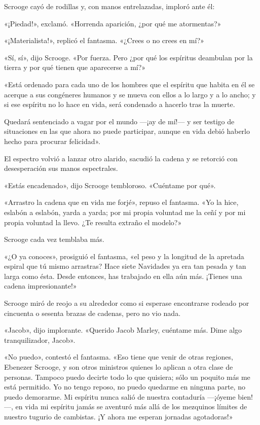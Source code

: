 \documentclass{novela}
\begin{document}
 Scrooge cayó de rodillas y, con manos entrelazadas, imploró ante él:

 «¡Piedad!», exclamó. «Horrenda aparición, ¿por qué me atormentas?»

 «¡Materialista!», replicó el fantasma. «¿Crees o no crees en mí?»

 «Sí, sí», dijo Scrooge. «Por fuerza. Pero ¿por qué los espíritus deambulan por la tierra y por qué tienen que aparecerse a mí?»

 «Está ordenado para cada uno de los hombres que el espíritu que habita en él se acerque a sus congéneres humanos y se mueva con ellos a lo largo y a lo ancho; y si ese espíritu no lo hace en vida, será condenado a hacerlo tras la muerte.

 Quedará sentenciado a vagar por el mundo ---¡ay de mí!--- y ser testigo de situaciones en las que ahora no puede participar, aunque en vida debió haberlo hecho para procurar felicidad».

 El espectro volvió a lanzar otro alarido, sacudió la cadena y se retorció con desesperación sus manos espectrales.

 «Estás encadenado», dijo Scrooge tembloroso. «Cuéntame por qué».

 «Arrastro la cadena que en vida me forjé», repuso el fantasma. «Yo la hice, eslabón a eslabón, yarda a yarda; por mi propia voluntad me la ceñí y por mi propia voluntad la llevo. ¿Te resulta extraño el modelo?»

 Scrooge cada vez temblaba más.

 «¿O ya conoces», prosiguió el fantasma, «el peso y la longitud de la apretada espiral que tú mismo arrastras? Hace siete Navidades ya era tan pesada y tan larga como ésta. Desde entonces, has trabajado en ella aún más. ¡Tienes una cadena impresionante!»

 Scrooge miró de reojo a su alrededor como si esperase encontrarse rodeado por cincuenta o sesenta brazas de cadenas, pero no vio nada.

 «Jacob», dijo implorante. «Querido Jacob Marley, cuéntame más. Dime algo tranquilizador, Jacob».

 «No puedo», contestó el fantasma. «Eso tiene que venir de otras regiones, Ebenezer Scrooge, y son otros ministros quienes lo aplican a otra clase de personas. Tampoco puedo decirte todo lo que quisiera; sólo un poquito más me está permitido. Yo no tengo reposo, no puedo quedarme en ninguna parte, no puedo demorarme. Mi espíritu nunca salió de nuestra contaduría ---¡óyeme bien!---, en vida mi espíritu jamás se aventuró más allá de los mezquinos límites de nuestro tugurio de cambistas. ¡Y ahora me esperan jornadas agotadoras!»
\end{document}
